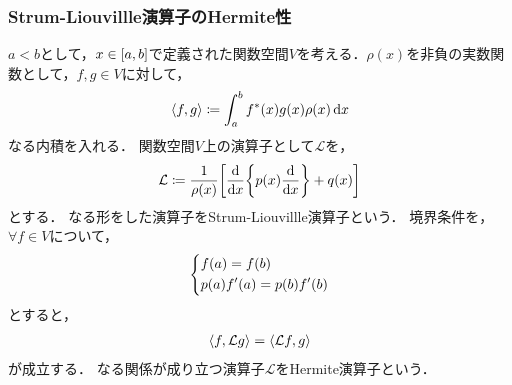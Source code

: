 \documentclass{report}
\begin{document}
    \subsubsection{Strum-Liouvillle演算子のHermite性}
      $a < b$として，$x\in \qty[a, b]$で定義された関数空間$V$を考える．$\rho(x)$を非負の実数関数として，$f, g\in V$に対して，
      \begin{align}
        \left\langle f, g \right\rangle \coloneqq \int_{a}^{b} f^*(x)g(x)\rho(x)\dd{x}
      \end{align}
      なる内積を入れる．
      関数空間$V$上の演算子として$\mathcal{L}$を，
      \begin{align}
        \mathcal{L} \coloneqq \frac{1}{\rho(x)}\qty[\dv{x}\qty{p(x)\dv{x}} + q(x)]\label{strum-liouville-operator-def}
      \end{align}
      とする．
      なる形をした演算子をStrum-Liouvillle演算子という．
      境界条件を，$\forall f \in V$について，
      \begin{align}
        \begin{dcases}
          f(a) = f(b) \\ 
          p(a)f'(a) = p(b)f'(b)
        \end{dcases}
      \end{align}
      とすると，
      \begin{align}
        \left\langle f, \mathcal{L}g \right\rangle = \left\langle \mathcal{L}f, g \right\rangle\label{hermite-def}
      \end{align}
      が成立する．
      なる関係が成り立つ演算子$\mathcal{L}$をHermite演算子という．
\end{document}
